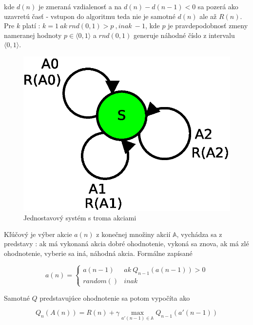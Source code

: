 kde $d(n)$ je zmeraná vzdialenosť a na $d(n) - d(n-1) < 0 $ sa pozerá
ako uzavretú časť - vstupon do algoritmu teda nie je samotné $d(n)$ ale až
$R(n)$. Pre $k$ platí : $k = 1 \ ak \ rnd(0, 1) > p \ , inak \ -1$, kde $p$ je pravdepodobnosť
zmeny nameranej hodnoty $p \in \langle 0, 1 \rangle $ a $rnd(0, 1)$ generuje náhodné
číslo z intervalu $\langle 0, 1 \rangle$.

\begin{figure}[!htb]
\centering
\includegraphics[scale=.6]{../diagrams/single_state.eps}
\caption{Jednostavový systém s troma akciami}
\label{img:single_state_system}
\end{figure}

Kľúčový je výber akcie $a(n)$ z konečnej množiny akcií $\mathbb{A}$,
vychádza sa z predstavy : ak má vykonaná akcia dobré ohodnotenie,
vykoná sa znova, ak má zlé ohodnotenie, vyberie sa iná, náhodná akcia.
Formálne zapísané

\begin{equation}
a(n) =
\left\{
	\begin{array}{ll}
		a(n-1)  & ak \ Q_{n-1}(a(n-1)) > 0 \\
    random() & inak
	\end{array}
\right.
\label{eq:q_nano_action_selection}
\end{equation}

Samotné $Q$ predstavujúce ohodnotenie sa potom vypočíta ako

\begin{equation}
Q_n(A(n)) = R(n) + \gamma  \max_{a'(n-1) \in \mathbb{A}} Q_{n-1}(a'(n-1))
\label{eq:nano_q_func}
\end{equation}

